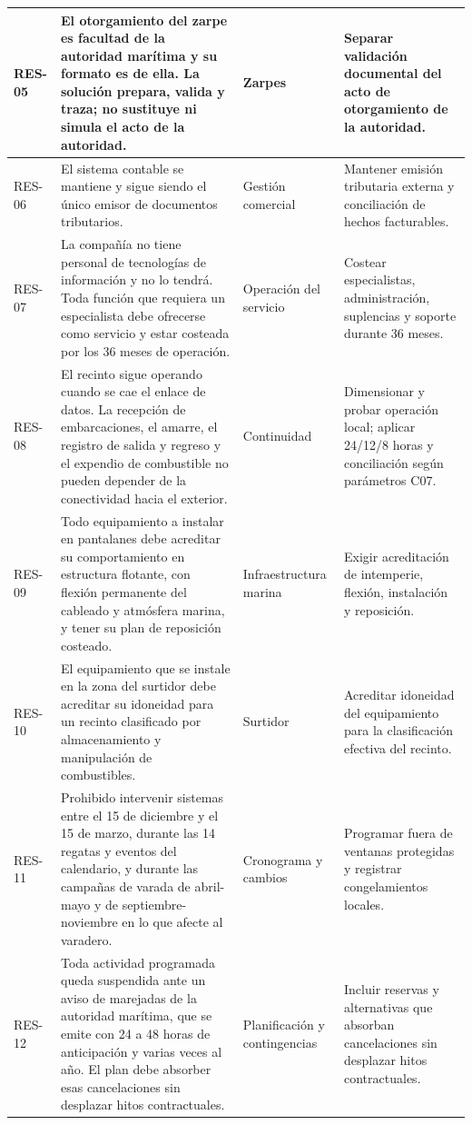 \begin{longtable}{|L{0.079681\AnchoTablaAnexo}|L{0.458167\AnchoTablaAnexo}|L{0.155378\AnchoTablaAnexo}|L{0.306774\AnchoTablaAnexo}|}
RES-05 & El otorgamiento del zarpe es facultad de la autoridad marítima y su formato es de ella. La solución prepara, valida y traza; no sustituye ni simula el acto de la autoridad. & Zarpes & Separar validación documental del acto de otorgamiento de la autoridad. \\ \hline
RES-06 & El sistema contable se mantiene y sigue siendo el único emisor de documentos tributarios. & Gestión comercial & Mantener emisión tributaria externa y conciliación de hechos facturables. \\ \hline
{}
RES-07 & La compañía no tiene personal de tecnologías de información y no lo tendrá. Toda función que requiera un especialista debe ofrecerse como servicio y estar costeada por los 36 meses de operación. & Operación del servicio & Costear especialistas, administración, suplencias y soporte durante 36 meses. \\ \hline
RES-08 & El recinto sigue operando cuando se cae el enlace de datos. La recepción de embarcaciones, el amarre, el registro de salida y regreso y el expendio de combustible no pueden depender de la conectividad hacia el exterior. & Continuidad & Dimensionar y probar operación local; aplicar 24/12/8 horas y conciliación según parámetros C07. \\ \hline
{}
RES-09 & Todo equipamiento a instalar en pantalanes debe acreditar su comportamiento en estructura flotante, con flexión permanente del cableado y atmósfera marina, y tener su plan de reposición costeado. & Infraestructura marina & Exigir acreditación de intemperie, flexión, instalación y reposición. \\ \hline
RES-10 & El equipamiento que se instale en la zona del surtidor debe acreditar su idoneidad para un recinto clasificado por almacenamiento y manipulación de combustibles. & Surtidor & Acreditar idoneidad del equipamiento para la clasificación efectiva del recinto. \\ \hline
{}
RES-11 & Prohibido intervenir sistemas entre el 15 de diciembre y el 15 de marzo, durante las 14 regatas y eventos del calendario, y durante las campañas de varada de abril-mayo y de septiembre-noviembre en lo que afecte al varadero. & Cronograma y cambios & Programar fuera de ventanas protegidas y registrar congelamientos locales. \\ \hline
RES-12 & Toda actividad programada queda suspendida ante un aviso de marejadas de la autoridad marítima, que se emite con 24 a 48 horas de anticipación y varias veces al año. El plan debe absorber esas cancelaciones sin desplazar hitos contractuales. & Planificación y contingencias & Incluir reservas y alternativas que absorban cancelaciones sin desplazar hitos contractuales. \\ \hline

\end{longtable}
